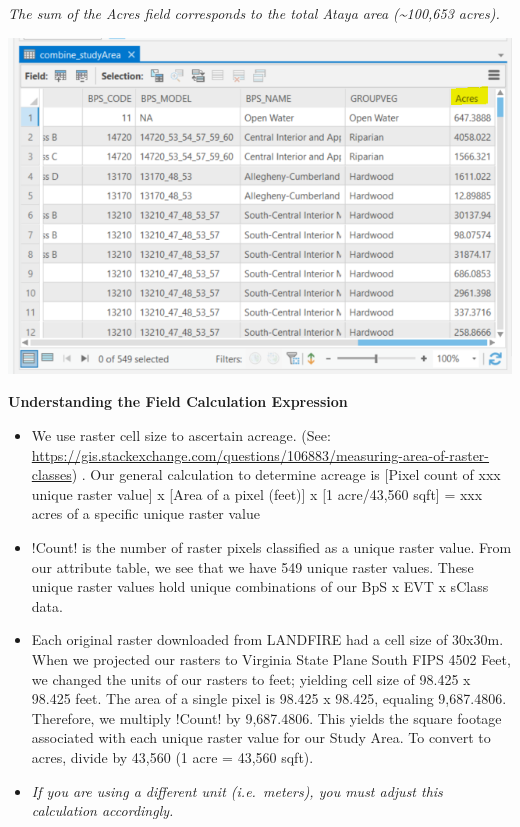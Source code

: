 \documentclass[
]{book}
\providecommand{\tightlist}{%
  \setlength{\itemsep}{0pt}\setlength{\parskip}{0pt}}
\begin{document}
\emph{The sum of the Acres field corresponds to the total Ataya area (\textasciitilde100,653 acres).}

\includegraphics[width=1000pt]{04_gis_screenshots/17_check_area_calc}

\textbf{Understanding the Field Calculation Expression}

\begin{itemize}
\tightlist
\item
  We use raster cell size to ascertain acreage. (See: \url{https://gis.stackexchange.com/questions/106883/measuring-area-of-raster-classes}) . Our general calculation to determine acreage is {[}Pixel count of xxx unique raster value{]} x {[}Area of a pixel (feet){]} x {[}1 acre/43,560 sqft{]} = xxx acres of a specific unique raster value
\item
  !Count! is the number of raster pixels classified as a unique raster value. From our attribute table, we see that we have 549 unique raster values. These unique raster values hold unique combinations of our BpS x EVT x sClass data.
\item
  Each original raster downloaded from LANDFIRE had a cell size of 30x30m. When we projected our rasters to Virginia State Plane South FIPS 4502 Feet, we changed the units of our rasters to feet; yielding cell size of 98.425 x 98.425 feet. The area of a single pixel is 98.425 x 98.425, equaling 9,687.4806. Therefore, we multiply !Count! by 9,687.4806. This yields the square footage associated with each unique raster value for our Study Area. To convert to acres, divide by 43,560 (1 acre = 43,560 sqft).
\item
  \emph{If you are using a different unit (i.e.~meters), you must adjust this calculation accordingly.}
\end{itemize}
\end{document}
